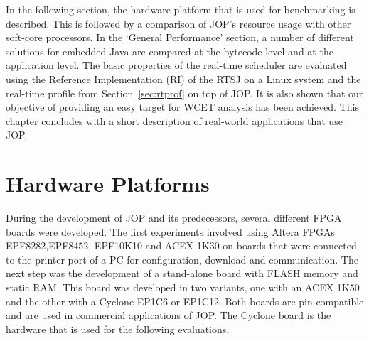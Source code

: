 In the following section, the hardware platform that is used for
benchmarking is described. This is followed by a comparison of JOP's
resource usage with other soft-core processors. In the `General
Performance' section, a number of different solutions for embedded
Java are compared at the bytecode level and at the application
level. The basic properties of the real-time scheduler are evaluated
using the Reference Implementation (RI) of the RTSJ on a Linux
system and the real-time profile from Section~\ref{sec:rtprof} on
top of JOP. It is also shown that our objective of providing an easy
target for WCET analysis has been achieved. This chapter concludes
with a short description of real-world applications that use JOP.

\section{Hardware Platforms}

During the development of JOP and its predecessors, several
different FPGA boards were developed. The first experiments involved
using Altera FPGAs EPF8282,\linebreak[4] EPF8452, EPF10K10 and ACEX
1K30 on boards that were connected to the printer port of a PC for
configuration, download and communication. The next step was the
development of a stand-alone board with FLASH memory and static RAM.
This board was developed in two variants, one with an ACEX 1K50 and
the other with a Cyclone EP1C6 or EP1C12. Both boards are
pin-compatible and are used in commercial applications of JOP. The
Cyclone board is the hardware that is used for the following
evaluations.

